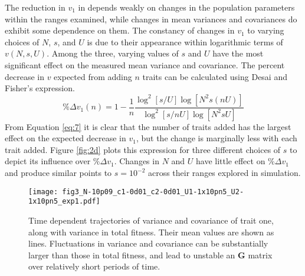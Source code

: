 \documentclass[11pt,twocolumn]{article}
\newcommand{\G}{\textbf{G }}
\begin{document}
The reduction in $v_1$ in depends weakly on changes in the population parameters within the ranges examined, while changes in mean variances and covariances do exhibit some dependence on them. The constancy of changes in $v_1$ to varying choices of $N$, $s$, and $U$ is due to their appearance within logarithmic terms of $v(N,s,U)$. Among the three, varying values of $s$ and $U$ have the most significant effect on the measured mean variance and covariance. The percent decrease in $v$ expected from adding $n$ traits can be calculated using Desai and Fisher's expression.
\begin{equation}\label{eq:7}
\% \Delta v_1 (n) 
= 1-\frac{1}{n}\frac{\log^2[s/U]\log[N^2s(nU)]}{\log^2[s/nU]\log[N^2sU]}
\end{equation}
From Equation \eqref{eq:7} it is clear that the number of traits added has the largest effect on the expected decrease in $v_1$, but the change is marginally less with each trait added. Figure \ref{fig:2d} plots this expression for three different choices of $s$ to depict its influence over $\%\Delta v_1$. Changes in $N$ and $U$ have little effect on $\%\Delta v_1$ and produce similar points to $s=10^{-2}$ across their ranges explored in simulation.\par

\begin{figure}[h!]
\texttt{[image: fig3\_N-10p09\_c1-0d01\_c2-0d01\_U1-1x10pn5\_U2-1x10pn5\_exp1.pdf]}
\caption{\footnotesize Time dependent trajectories of variance and covariance of trait one, along with variance in total fitness. Their mean values are shown as lines. Fluctuations in variance and covariance can be substantially larger than those in total fitness, and lead to unstable an \G  matrix over relatively short periods of time.}\label{fig:3}
\end{figure}
\end{document}
